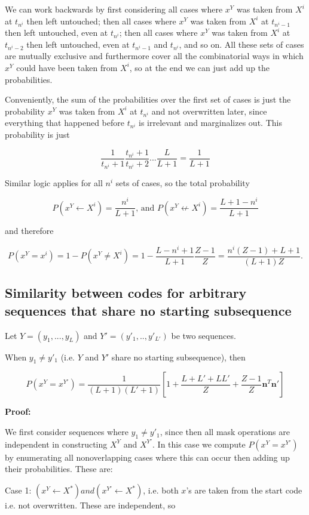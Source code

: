 \documentclass{article}
\begin{document}
We can work backwards by first considering all cases where $x^Y$ was taken from $X^i$ at $t_{n^i}$ then left untouched; then all cases where $x^Y$ was taken from $X^i$ at $t_{n^i-1}$ then left untouched, even at $t_{n^i}$; then all cases where $x^Y$ was taken from $X^i$ at $t_{n^i-2}$ then left untouched, even at $t_{n^i-1}$ and $t_{n^i}$, and so on. All these sets of cases are mutually exclusive and furthermore cover all the combinatorial ways in which $x^Y$ could have been taken from $X^i$, so at the end we can just add up the probabilities.

Conveniently, the sum of the probabilities over the first set of cases is just the probability $x^Y$ was taken from $X^i$ at $t_{n^i}$ and not overwritten later, since everything that happened before $t_{n^i}$ is irrelevant and marginalizes out. This probability is just 

$$\frac{1}{t_{n^i}+1}\frac{t_{n^i}+1}{t_{n^i}+2}...\frac{L}{L+1} = \frac{1}{L+1}$$

Similar logic applies for all $n^i$ sets of cases, so the total probability

$$P(x^Y \leftarrow X^i) = \frac{n^i}{L+1} \textrm{, and } P(x^Y \not\leftarrow X^i) = \frac{L+1-n^i}{L+1}$$

and therefore 

$$P(x^Y = x^i) = 1 - P(x^Y \neq X^i) = 1 - \frac{L-n^i+1}{L+1}\frac{Z-1}{Z} = \frac{n^i(Z-1) + L + 1}{(L+1)Z}.$$

\subsection{Similarity between codes for arbitrary sequences that share no starting subsequence}

Let $Y = (y_1, ..., y_L)$ and $Y' = (y'_1, .., y'_{L'})$ be two sequences. 

When $y_1 \neq y'_1$ (i.e. $Y$ and $Y'$ share no starting subsequence), then

$$P(x^Y = x^{Y'}) = \frac{1}{(L+1)(L'+1)}\left[1 + \frac{L + L' + LL'}{Z} + \frac{Z-1}{Z}\mathbf{n}^T\mathbf{n}'\right]$$

\textbf{Proof:}

We first consider sequences where $y_1 \neq y'_1$, since then all mask operations are independent in constructing $X^Y$ and $X^{Y'}$. In this case we compute $P(x^Y = x^{Y'})$ by enumerating all nonoverlapping cases where this can occur then adding up their probabilities. These are:

Case 1: $(x^Y \leftarrow X^*) and (x^{Y'} \leftarrow X^*)$, i.e. both $x$'s are taken from the start code i.e. not overwritten. These are independent, so
\end{document}
